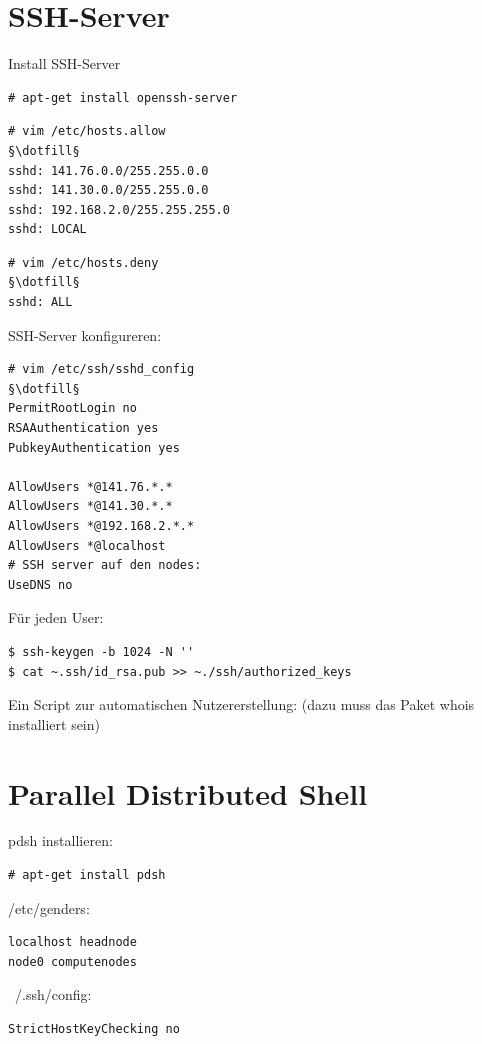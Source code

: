 \section{SSH-Server}
Install SSH-Server
\begin{lstlisting}[style=Bash]
# apt-get install openssh-server 
\end{lstlisting}
\begin{lstlisting}[style=Bash]
# vim /etc/hosts.allow
§\dotfill§
sshd: 141.76.0.0/255.255.0.0
sshd: 141.30.0.0/255.255.0.0
sshd: 192.168.2.0/255.255.255.0
sshd: LOCAL 
\end{lstlisting}
\begin{lstlisting}[style=Bash]
# vim /etc/hosts.deny
§\dotfill§
sshd: ALL
\end{lstlisting}

SSH-Server konfigureren:
\begin{lstlisting}[style=Bash]
# vim /etc/ssh/sshd_config
§\dotfill§
PermitRootLogin no
RSAAuthentication yes
PubkeyAuthentication yes

AllowUsers *@141.76.*.*
AllowUsers *@141.30.*.*
AllowUsers *@192.168.2.*.*
AllowUsers *@localhost
# SSH server auf den nodes:
UseDNS no
\end{lstlisting}
Für jeden User:
\begin{lstlisting}[style=Bash]
$ ssh-keygen -b 1024 -N ''
$ cat ~.ssh/id_rsa.pub >> ~./ssh/authorized_keys
\end{lstlisting}
Ein Script zur automatischen Nutzererstellung: (dazu muss das Paket whois installiert sein)

\section{Parallel Distributed Shell}
pdsh installieren:
\begin{lstlisting}[style=Bash]
# apt-get install pdsh
\end{lstlisting}
/etc/genders:
\begin{lstlisting}[style=Bash]
localhost headnode
node0 computenodes
\end{lstlisting}
~/.ssh/config:
\begin{lstlisting}[style=Bash]
StrictHostKeyChecking no
\end{lstlisting}


